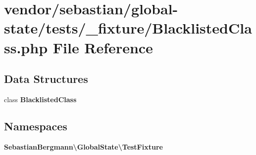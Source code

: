 \section{vendor/sebastian/global-\/state/tests/\+\_\+fixture/\+Blacklisted\+Class.php File Reference}
\label{_blacklisted_class_8php}
\subsection*{Data Structures}
\begin{DoxyCompactItemize}
\item 
class {\bf Blacklisted\+Class}
\end{DoxyCompactItemize}
\subsection*{Namespaces}
\begin{DoxyCompactItemize}
\item 
 {\bf Sebastian\+Bergmann\textbackslash{}\+Global\+State\textbackslash{}\+Test\+Fixture}
\end{DoxyCompactItemize}
